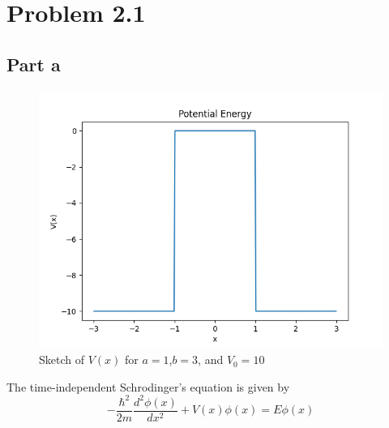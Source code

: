 \documentclass[12pt]{report}
\begin{document}
\maketitle
\section*{Problem 2.1}
\subsection*{Part a}
\begin{figure}[H]
    \centering
    \includegraphics[scale=0.7]{Figure_1.png}
    \caption{Sketch of $V(x)$ for $a=1$,$b=3$, and $V_0 = 10$}
    \label{fig:enter-label}
\end{figure}
The time-independent Schrodinger's equation is given by
\begin{equation*}
    -\frac{\hbar^2}{2m} \frac{d^2\phi(x)}{dx^2} + V(x) \phi(x) = E\phi(x)
\end{equation*}
\end{document}
